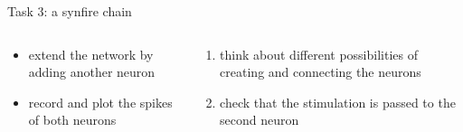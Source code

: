 \documentclass[aspectratio=169]{beamer}
\begin{document}
\begin{frame}{Task 3: a synfire chain}
	\begin{columns}[onlytextwidth]
		\begin{column}{0.48\textwidth}
			\begin{center}
			\end{center}

			\begin{itemize}
				\item extend the network by adding another neuron
				\item record and plot the spikes of both neurons
			\end{itemize}
		\end{column}
		\hfill
		\begin{column}{0.48\textwidth}
			\begin{enumerate}
				\item think about different possibilities of creating and connecting the neurons
				\item check that the stimulation is passed to the second neuron
			\end{enumerate}
		\end{column}
	\end{columns}
\end{frame}
\end{document}
